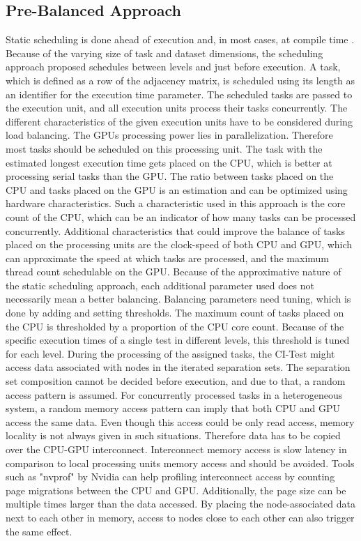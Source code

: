\subsection{Pre-Balanced Approach}
Static scheduling is done ahead of execution and, in most cases, at compile time \cite{singhSurveyStaticScheduling2015}. Because of the varying size of task and dataset dimensions, the scheduling approach proposed schedules between levels and just before execution. A task, which is defined as a row of the adjacency matrix, is scheduled using its length as an identifier for the execution time parameter. The scheduled tasks are passed to the execution unit, and all execution units process their tasks concurrently. The different characteristics of the given execution units have to be considered during load balancing. The GPUs processing power lies in parallelization. Therefore most tasks should be scheduled on this processing unit. The task with the estimated longest execution time gets placed on the CPU, which is better at processing serial tasks than the GPU. The ratio between tasks placed on the CPU and tasks placed on the GPU is an estimation and can be optimized using hardware characteristics. Such a characteristic used in this approach is the core count of the CPU, which can be an indicator of how many tasks can be processed concurrently. Additional characteristics that could improve the balance of tasks placed on the processing units are the clock-speed of both CPU and GPU, which can approximate the speed at which tasks are processed, and the maximum thread count schedulable on the GPU. Because of the approximative nature of the static scheduling approach, each additional parameter used does not necessarily mean a better balancing. Balancing parameters need tuning, which is done by adding and setting thresholds.
The maximum count of tasks placed on the CPU is thresholded by a proportion of the CPU core count. Because of the specific execution times of a single test in different levels, this threshold is tuned for each level.
During the processing of the assigned tasks, the CI-Test might access data associated with nodes in the iterated separation sets. The separation set composition cannot be decided before execution, and due to that, a random access pattern is assumed. For concurrently processed tasks in a  heterogeneous system, a random memory access pattern can imply that both CPU and GPU access the same data. Even though this access could be only read access, memory locality is not always given in such situations. Therefore data has to be copied over the CPU-GPU interconnect. Interconnect memory access is slow latency in comparison to local processing units memory access and should be avoided. Tools such as "nvprof" by Nvidia can help profiling interconnect access by counting page migrations between the CPU and GPU. Additionally, the page size can be multiple times larger than the data accessed. By placing the node-associated data next to each other in memory, access to nodes close to each other can also trigger the same effect.

